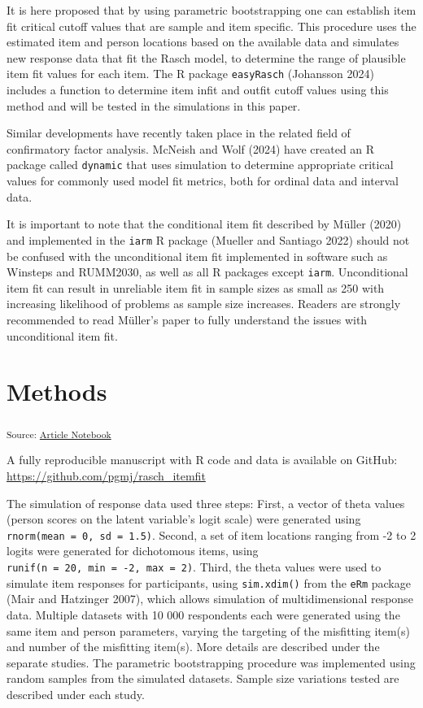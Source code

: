 \documentclass[
  letterpaper,
  DIV=11,
  numbers=noendperiod]{scrartcl}
\begin{document}
It is here proposed that by using parametric bootstrapping one can
establish item fit critical cutoff values that are sample and item
specific. This procedure uses the estimated item and person locations
based on the available data and simulates new response data that fit the
Rasch model, to determine the range of plausible item fit values for
each item. The R package \texttt{easyRasch} (Johansson 2024) includes a
function to determine item infit and outfit cutoff values using this
method and will be tested in the simulations in this paper.

Similar developments have recently taken place in the related field of
confirmatory factor analysis. McNeish and Wolf (2024) have created an R
package called \texttt{dynamic} that uses simulation to determine
appropriate critical values for commonly used model fit metrics, both
for ordinal data and interval data.

It is important to note that the conditional item fit described by
Müller (2020) and implemented in the \texttt{iarm} R package (Mueller
and Santiago 2022) should not be confused with the unconditional item
fit implemented in software such as Winsteps and RUMM2030, as well as
all R packages except \texttt{iarm}. Unconditional item fit can result
in unreliable item fit in sample sizes as small as 250 with increasing
likelihood of problems as sample size increases. Readers are strongly
recommended to read Müller's paper to fully understand the issues with
unconditional item fit.

\section{Methods}\label{methods}

\textsubscript{Source:
\href{https://pgmj.github.io/rasch_itemfit/index.qmd.html}{Article
Notebook}}

A fully reproducible manuscript with R code and data is available on
GitHub: \url{https://github.com/pgmj/rasch_itemfit}

The simulation of response data used three steps: First, a vector of
theta values (person scores on the latent variable's logit scale) were
generated using \texttt{rnorm(mean\ =\ 0,\ sd\ =\ 1.5)}. Second, a set
of item locations ranging from -2 to 2 logits were generated for
dichotomous items, using
\texttt{runif(n\ =\ 20,\ min\ =\ -2,\ max\ =\ 2)}. Third, the theta
values were used to simulate item responses for participants, using
\texttt{sim.xdim()} from the \texttt{eRm} package (Mair and Hatzinger
2007), which allows simulation of multidimensional response data.
Multiple datasets with 10 000 respondents each were generated using the
same item and person parameters, varying the targeting of the misfitting
item(s) and number of the misfitting item(s). More details are described
under the separate studies. The parametric bootstrapping procedure was
implemented using random samples from the simulated datasets. Sample
size variations tested are described under each study.
\end{document}
